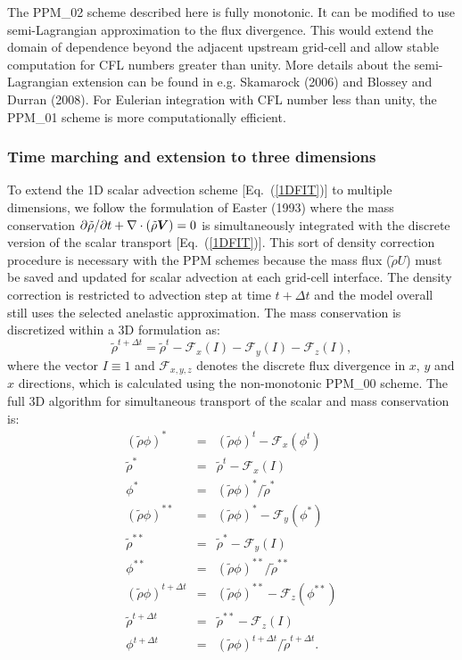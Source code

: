   The PPM\_{02} scheme described here is fully monotonic. It can be
  modified to use semi-Lagrangian approximation to the flux divergence.
  This would extend the domain of dependence beyond the adjacent upstream
  grid-cell and allow stable computation for CFL numbers greater
  than unity. More details about the semi-Lagrangian extension can be
  found in e.g. Skamarock (2006) and Blossey and Durran (2008). For
  Eulerian integration with CFL number less than unity, the PPM\_01 scheme
  is more computationally efficient.

  \subsubsection{Time marching and extension to three dimensions}

  To extend the 1D scalar advection scheme [Eq.~(\ref{1DFIT})] to multiple
  dimensions, we follow the formulation of Easter (1993) where the mass
  conservation $\partial\tilde{\rho}/\partial t + \nabla \cdot (\tilde{\rho} \mbox{\boldmath$V$})=0$ is
  simultaneously integrated with the discrete version of the scalar
  transport [Eq.~(\ref{1DFIT})]. This sort of density correction procedure is
  necessary with the PPM schemes because the mass flux ($\tilde{\rho} U$) must
  be saved and updated for scalar advection at each grid-cell
  interface. The density correction is restricted to advection step at time $t+\Delta t$
  and the model overall still uses the selected anelastic
  approximation. The mass conservation is discretized within a 3D
  formulation as:
  \begin{equation}
   \label{mass}
    \tilde{\rho}^{t+\Delta t} = \tilde{\rho}^{t} - \mathcal{F}_{x}(I) -
    \mathcal{F}_{y}(I) - \mathcal{F}_{z}(I),
  \end{equation}
  where the vector $I \equiv 1$ and $\mathcal{F}_{x,y,z}$ denotes the
  discrete flux divergence in $x$, $y$ and $x$ directions, which is
  calculated using the non-monotonic PPM\_00 scheme. The full 3D
  algorithm for simultaneous transport of the scalar and mass
  conservation is:
  \begin{eqnarray}
   \label{easter}
   (\tilde{\rho}\phi)^{*} &=& (\tilde{\rho} \phi)^{t} - \mathcal{F}_{x}(\phi^{t}) \\
   \nonumber
   \tilde{\rho}^{*} &=& \tilde{\rho}^{t} - \mathcal{F}_{x}(I) \\ \nonumber
   \phi^{*} &=& (\tilde{\rho}\phi)^{*} / \tilde{\rho}^{*} \\ \nonumber
   (\tilde{\rho}\phi)^{**} &=& (\tilde{\rho} \phi)^{*} - \mathcal{F}_{y}(\phi^{*}) \\
   \nonumber
   \tilde{\rho}^{**} &=& \tilde{\rho}^{*} - \mathcal{F}_{y}(I) \\ \nonumber
   \phi^{**} &=& (\tilde{\rho}\phi)^{**} / \tilde{\rho}^{**} \\ \nonumber
   (\tilde{\rho}\phi)^{t+\Delta t} &=& (\tilde{\rho} \phi)^{**} -
   \mathcal{F}_{z}(\phi^{**}) \\ \nonumber
   \tilde{\rho}^{t+\Delta t} &=& \tilde{\rho}^{**} - \mathcal{F}_{z}(I) \\ \nonumber
   \phi^{t+\Delta t} &=& (\tilde{\rho}\phi)^{t+\Delta t} / \tilde{\rho}^{t+\Delta t}.
  \end{eqnarray}

